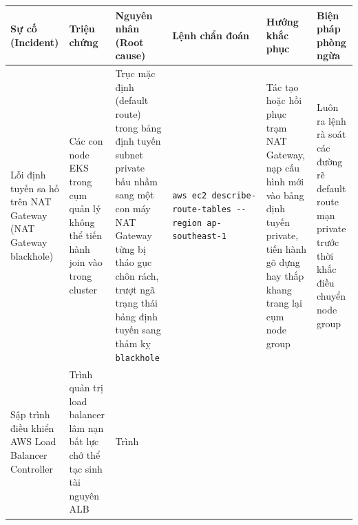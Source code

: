 {
\begingroup
\small
\setlength{\tabcolsep}{3pt}
\renewcommand{\arraystretch}{1.15}
\begin{longtable}{@{}
  >{\raggedright\arraybackslash}p{}
  >{\raggedright\arraybackslash}p{}
  >{\raggedright\arraybackslash}p{}
  >{\raggedright\arraybackslash}p{}
  >{\raggedright\arraybackslash}p{}
  >{\raggedright\arraybackslash}p{}@{}}
\toprule\noalign{}
\begin{minipage}[b]{\linewidth}\raggedright
Sự cố (Incident)
\end{minipage} & \begin{minipage}[b]{\linewidth}\raggedright
Triệu chứng
\end{minipage} & \begin{minipage}[b]{\linewidth}\raggedright
Nguyên nhân (Root cause)
\end{minipage} & \begin{minipage}[b]{\linewidth}\raggedright
Lệnh chẩn đoán
\end{minipage} & \begin{minipage}[b]{\linewidth}\raggedright
Hướng khắc phục
\end{minipage} & \begin{minipage}[b]{\linewidth}\raggedright
Biện pháp phòng ngừa
\end{minipage} \\
\midrule\noalign{}
\endhead
\bottomrule\noalign{}
\endlastfoot
Lỗi định tuyến sa hố trên NAT Gateway (NAT Gateway blackhole) & Các con
node EKS trong cụm quản lý không thể tiến hành join vào trong cluster &
Trục mặc định (default route) trong bảng định tuyến subnet private bấu
nhầm sang một con máy NAT Gateway từng bị tháo gục chôn rách, trượt ngã
trạng thái bảng định tuyến sang thảm kỵ \texttt{blackhole} &
\texttt{aws\ ec2\ describe-\allowbreak{}route-\allowbreak{}tables\ -\/\allowbreak{}-region\ ap-\allowbreak{}southeast-\allowbreak{}1} &
Tác tạo hoặc hồi phục trạm NAT Gateway, nạp cấu hình mới vào bảng định
tuyến private, tiến hành gõ dựng hay thắp khang trang lại cụm node group
& Luôn ra lệnh rà soát các đường rẽ default route mạn private trước thời
khắc điều chuyển node group \\
Sập trình điều khiển AWS Load Balancer Controller & Trình quản trị load
balancer lâm nạn bất lực chớ thể tạc sinh tài nguyên ALB & Trình

\end{longtable}}
